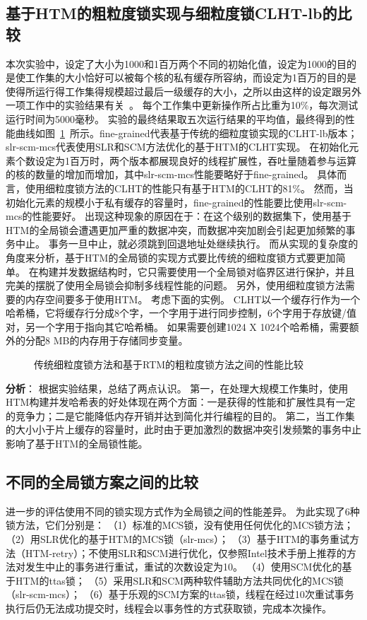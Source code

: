 \subsection{基于HTM的粗粒度锁实现与细粒度锁CLHT-lb的比较}
本次实验中，设定了大小为1000和1百万两个不同的初始化值，设定为1000的目的是使工作集的大小恰好可以被每个核的私有缓存所容纳，而设定为1百万的目的是使得所运行得工作集得规模超过最后一级缓存的大小，之所以由这样的设定跟另外一项工作中的实验结果有关~\cite{}。
每个工作集中更新操作所占比重为10\%，每次测试运行时间为5000毫秒。
实验的最终结果取五次运行结果的平均值，最终得到的性能曲线如图~\ref{fig:htm_coarse_grained}~所示。fine-grained代表基于传统的细粒度锁实现的CLHT-lb版本；slr-scm-mcs代表使用SLR和SCM方法优化的基于HTM的CLHT实现。
在初始化元素个数设定为1百万时，两个版本都展现良好的线程扩展性，吞吐量随着参与运算的核的数量的增加而增加，其中slr-scm-mcs性能要略好于fine-grained。
具体而言，使用细粒度锁方法的CLHT的性能只有基于HTM的CLHT的81\%。
然而，当初始化元素的规模小于私有缓存的容量时，fine-grained的性能要比使用slr-scm-mcs的性能要好。
出现这种现象的原因在于：在这个级别的数据集下，使用基于HTM的全局锁会遭遇更加严重的数据冲突，而数据冲突加剧会引起更加频繁的事务中止。
事务一旦中止，就必须跳到回退地址处继续执行。
而从实现的复杂度的角度来分析，基于HTM的全局锁的实现方式要比传统的细粒度锁方式要更加简单。
在构建并发数据结构时，它只需要使用一个全局锁对临界区进行保护，并且完美的摆脱了使用全局锁会抑制多线程性能的问题。
另外，使用细粒度锁方法需要的内存空间要多于使用HTM。
考虑下面的实例。
CLHT以一个缓存行作为一个哈希桶，它将缓存行分成8个字，一个字用于进行同步控制，6个字用于存放键/值对，另一个字用于指向其它哈希桶。
如果需要创建1024 X 1024个哈希桶，需要额外的分配8 MB的内存用于存储同步变量。
\begin{figure}[htbp]
\centering
\caption{传统细粒度锁方法和基于RTM的粗粒度锁方法之间的性能比较}
\label{fig:htm_coarse_grained}
\end{figure}

\textbf{分析}： 根据实验结果，总结了两点认识。
第一，在处理大规模工作集时，使用HTM构建并发哈希表的好处体现在两个方面：一是获得的性能和扩展性具有一定的竞争力；二是它能降低内存开销并达到简化并行编程的目的。
第二，当工作集的大小小于片上缓存的容量时，此时由于更加激烈的数据冲突引发频繁的事务中止影响了基于HTM的全局锁性能。

\subsection{不同的全局锁方案之间的比较}
进一步的评估使用不同的锁实现方式作为全局锁之间的性能差异。
为此实现了6种锁方法，它们分别是：
（1）标准的MCS锁，没有使用任何优化的MCS锁方法；
（2）用SLR优化的基于HTM的MCS锁（slr-mcs）；
（3）基于HTM的事务重试方法（HTM-retry）；不使用SLR和SCM进行优化，仅参照Intel技术手册上推荐的方法对发生中止的事务进行重试，重试的次数设定为10。
（4）使用SCM优化的基于HTM的ttas锁；
（5）采用SLR和SCM两种软件辅助方法共同优化的MCS锁（slr-scm-mcs）；
（6）基于乐观的SCM方案的ttas锁，线程在经过10次重试事务执行后仍无法成功提交时，线程会以事务性的方式获取锁，完成本次操作。


